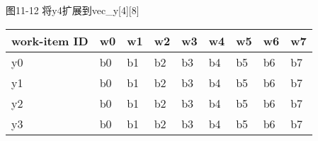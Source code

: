 \hspace*{\fill} \par %
图11-12 将y4扩展到vec\_y[4][8]
\begin{table}[H]
	\begin{tabular}{|l|l|l|l|l|l|l|l|l|}
		\hline
		work-item ID & w0 & w1 & w2 & w3 & w4 & w5 & w6 & w7 \\ \hline
		y0           & b0 & b1 & b2 & b3 & b4 & b5 & b6 & b7 \\ \hline
		y1           & b0 & b1 & b2 & b3 & b4 & b5 & b6 & b7 \\ \hline
		y2           & b0 & b1 & b2 & b3 & b4 & b5 & b6 & b7 \\ \hline
		y3           & b0 & b1 & b2 & b3 & b4 & b5 & b6 & b7 \\ \hline
	\end{tabular}
\end{table}















